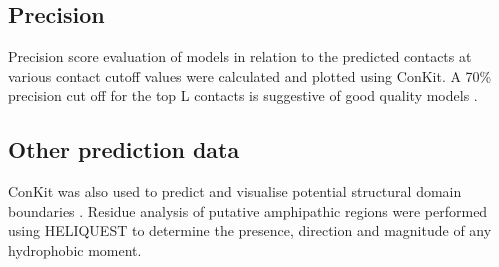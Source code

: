\subsection{Precision}
Precision score evaluation of models in relation to the predicted contacts at various contact cutoff values were calculated and plotted using ConKit. A 70\% precision cut off  for the top L contacts is suggestive of good quality models \cite{DeOliveira2016}.


\subsection{Other prediction data}
ConKit was also used to predict and visualise potential structural domain boundaries \cite{Rigden2002}\cite{Simkovic2017}. Residue analysis of putative amphipathic regions were performed using HELIQUEST \cite{Gautier2008} to determine the presence, direction and magnitude of any hydrophobic moment. 
